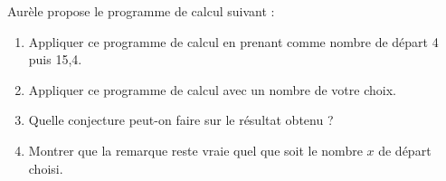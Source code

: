 \begin{colonne*exercice}
\bigskip


\begin{exercice} %
   Aurèle propose le programme de calcul suivant :
   \begin{center}
   \end{center}
   \begin{enumerate}
      \item Appliquer ce programme de calcul en prenant comme nombre de départ 4 puis 15,4.
      \item Appliquer ce programme de calcul avec un nombre de votre choix.
      \item Quelle conjecture peut-on faire sur le résultat obtenu ?
      \item Montrer que la remarque reste vraie quel que soit le nombre $x$ de départ choisi.
   \end{enumerate}
\end{exercice}


\end{colonne*exercice}

